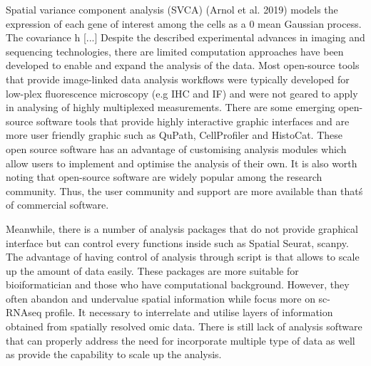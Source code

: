 Spatial variance component analysis (SVCA) (Arnol et al. 2019) models the expression of each gene of interest among the cells as a 0 mean Gaussian process. The covariance h
[...]
Despite the described experimental advances in imaging and sequencing technologies, there are limited computation approaches have been developed to enable and expand the analysis of the data. Most open-source tools that provide image-linked data analysis workflows were typically developed for low-plex fluorescence microscopy (e.g IHC and IF) and were not geared to apply in analysing of highly multiplexed measurements. There are some emerging open-source software tools that provide highly interactive graphic interfaces and are more user friendly graphic such as QuPath, CellProfiler and HistoCat. These open source software has an advantage of customising analysis modules which allow users to implement and optimise the analysis of their own. It is also worth noting that open-source software are widely popular among the research community. Thus, the user community and support are more available  than that\'s of commercial software. 

Meanwhile, there is a number of analysis packages that do not provide graphical interface but can control every functions inside such as Spatial Seurat, scanpy. The advantage of having control of analysis through script is that allows to scale up the amount of data easily. These packages are more suitable for bioiformatician and those who have computational background. However, they often abandon and undervalue spatial information while focus more on sc-RNAseq profile. It necessary to interrelate and utilise layers of information obtained from spatially resolved omic data. There is still lack of analysis software that can properly address the need for incorporate multiple type of data as well as provide the capability to scale up the analysis.


\label{subsec:ST_seq}






